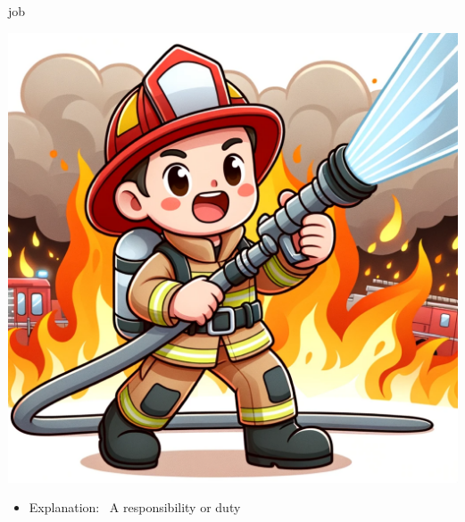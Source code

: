 \documentclass[avery5371, grid,frame]{flashcards}
\begin{document}
\renewcommand{\cardpaper}{a4paper}
\renewcommand{\cardpapermode}{landscape}
\renewcommand{\cardrows}{2}
\renewcommand{\cardcolumns}{2}
\setlength{\cardheight}{3.5in}
\setlength{\cardwidth}{5.0in}
\setlength{\topoffset}{0.50in}
\setlength{\oddoffset}{0.50in}
\setlength{\evenoffset}{0.50in}

\begin{flashcard}{job}
    \vspace*{\fill}
    \begin{center}
        \begin{minipage}[c]{.45\textwidth}
            \includegraphics[width=\textwidth]{cards/j/job/job - a firefighter in uniform bravely holding a hose, with flames in the background.png}
        \end{minipage}
        \begin{minipage}[c]{.45\textwidth}
            \begin{itemize}\setlength\itemsep{12pt}
            \item Explanation: \ A responsibility or duty


\end{itemize}
\end{minipage}
\end{center}
\end{flashcard}
\end{document}
